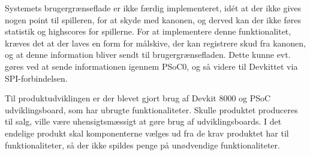 \noindent Systemets brugergrænseflade er ikke færdig implementeret, idét at der ikke gives nogen point til spilleren, for at skyde med kanonen, og derved kan der ikke føres statistik og highscores for spillerne. For at implementere denne funktionalitet, kræves det at der laves en form for målskive, der kan registrere skud fra kanonen, og at denne information bliver sendt til brugergrænsefladen. Dette kunne evt. gøres ved at sende informationen igennem PSoC0, og så videre til Devkittet via SPI-forbindelsen. \newline

\noindent Til produktudviklingen er der blevet gjort brug af Devkit 8000 og PSoC udviklingsboard, som har ubrugte funktionaliteter. Skulle produktet produceres til salg, ville være uhensigtsmæssigt at gøre brug af udviklingsboards. I det endelige produkt skal komponenterne vælges ud fra de krav produktet har til funktionaliteter, så der ikke spildes penge på unødvendige funktionaliteter.